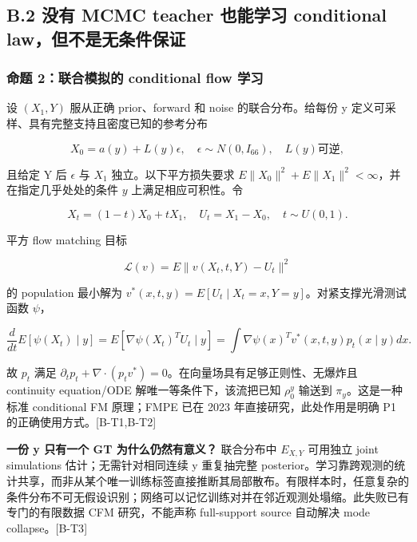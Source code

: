 \documentclass[
  11pt,
  a4paper,
]{article}
\begin{document}
\hypertarget{b.2-ux6ca1ux6709-mcmc-teacher-ux4e5fux80fdux5b66ux4e60-conditional-lawux4f46ux4e0dux662fux65e0ux6761ux4ef6ux4fddux8bc1}{%
\subsection{B.2 没有 MCMC teacher 也能学习 conditional
law，但不是无条件保证}\label{b.2-ux6ca1ux6709-mcmc-teacher-ux4e5fux80fdux5b66ux4e60-conditional-lawux4f46ux4e0dux662fux65e0ux6761ux4ef6ux4fddux8bc1}}

\hypertarget{ux547dux9898-2ux8054ux5408ux6a21ux62dfux7684-conditional-flow-ux5b66ux4e60}{%
\subsubsection{命题 2：联合模拟的 conditional flow
学习}\label{ux547dux9898-2ux8054ux5408ux6a21ux62dfux7684-conditional-flow-ux5b66ux4e60}}

设 \((X_1,Y)\) 服从正确 prior、forward 和 noise 的联合分布。给每份 y
定义可采样、具有完整支持且密度已知的参考分布

\[
X_0=a(y)+L(y)\epsilon,\quad\epsilon\sim N(0,I_{66}),\quad L(y)\text{可逆},
\]

且给定 Y 后 \(\epsilon\) 与 \(X_1\) 独立。以下平方损失要求
\(E\|X_0\|^2+E\|X_1\|^2<\infty\)，并在指定几乎处处的条件 \(y\)
上满足相应可积性。令

\[
X_t=(1-t)X_0+tX_1,\quad U_t=X_1-X_0,\quad t\sim U(0,1).
\]

平方 flow matching 目标

\[
\mathcal{L}(v)=E\|v(X_t,t,Y)-U_t\|^2
\]

的 population 最小解为
\(v^*(x,t,y)=E[U_t\mid X_t=x,Y=y]\)。对紧支撑光滑测试函数 \(\psi\)，

\[
\frac{d}{dt}E[\psi(X_t)\mid y]
=E[\nabla\psi(X_t)^TU_t\mid y]
=\int\nabla\psi(x)^Tv^*(x,t,y)p_t(x\mid y)dx.
\]

故 \(p_t\) 满足
\(\partial_t p_t+\nabla\cdot(p_tv^*)=0\)。在向量场具有足够正则性、无爆炸且
continuity equation/ODE 解唯一等条件下，该流把已知 \(\rho_0^y\) 输送到
\(\pi_y\)。这是一种标准 conditional FM 原理；FMPE 已在 2023
年直接研究，此处作用是明确 P1 的正确使用方式。{[}B-T1,B-T2{]}

\textbf{一份 y 只有一个 GT 为什么仍然有意义？} 联合分布中 \(E_{X,Y}\)
可用独立 joint simulations 估计；无需针对相同连续 y 重复抽完整
posterior。学习靠跨观测的统计共享，而非从某个唯一训练标签直接推断其局部散布。有限样本时，任意复杂的条件分布不可无假设识别；网络可以记忆训练对并在邻近观测处塌缩。此失败已有专门的有限数据
CFM 研究，不能声称 full-support source 自动解决 mode
collapse。{[}B-T3{]}
\end{document}

